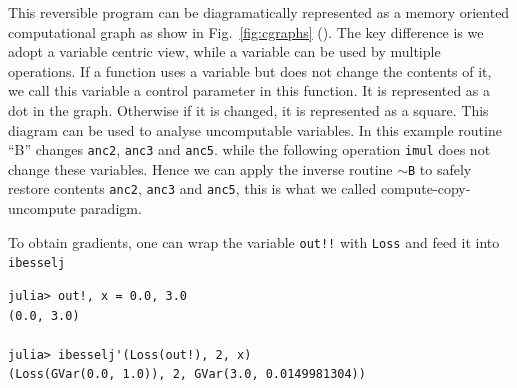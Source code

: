 \documentclass[aps,twocolumn,longbibliography,english,superscriptaddress]{revtex4-1}
\newcommand{\<}{\langle}
\renewcommand{\>}{\rangle}
\newcommand{\Fig}[1]{Fig.~\ref{#1}}
\theoremstyle{definition}\newtheorem{definition}{\textit{Definition}}
\begin{document}
This reversible program can be diagramatically represented as a memory oriented computational graph as show in \Fig{fig:cgraphs} ().
The key difference is we adopt a variable centric view, while a variable can be used by multiple operations.
If a function uses a variable but does not change the contents of it, we call this variable a control parameter in this function. It is represented as a dot in the graph. Otherwise if it is changed, it is represented as a square.
This diagram can be used to analyse uncomputable variables. In this example routine ``B'' changes \texttt{anc2}, \texttt{anc3} and \texttt{anc5}.
while the following operation \texttt{imul} does not change these variables.
Hence we can apply the inverse routine \texttt{$\sim$B} to safely restore contents \texttt{anc2}, \texttt{anc3} and \texttt{anc5}, this is what we called compute-copy-uncompute paradigm.


To obtain gradients, one can wrap the variable \texttt{out!!} with \texttt{Loss} and feed it into \texttt{ibesselj\textquotesingle}

\begin{minipage}{.44\textwidth}
\begin{lstlisting}
julia> out!, x = 0.0, 3.0
(0.0, 3.0)

julia> ibesselj'(Loss(out!), 2, x)
(Loss(GVar(0.0, 1.0)), 2, GVar(3.0, 0.0149981304))
\end{lstlisting}
\end{minipage}
\end{document}
